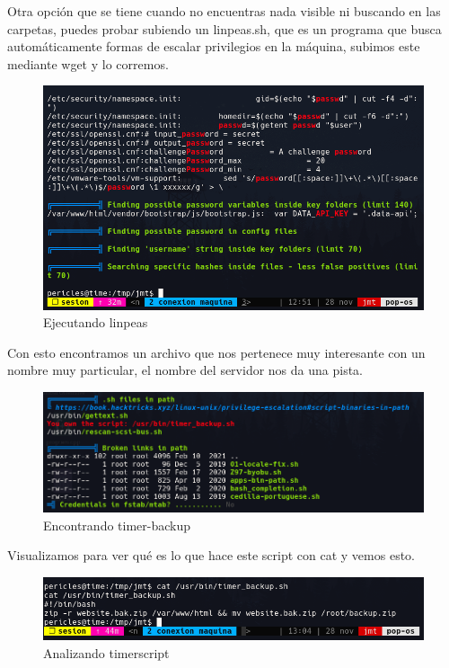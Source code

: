 \documentclass{article}
\begin{document}
Otra opción que se tiene cuando no encuentras nada visible ni buscando en las carpetas, puedes probar subiendo un linpeas.sh, que es un programa que busca automáticamente formas de escalar privilegios en la máquina, subimos este mediante wget y lo corremos.
\begin{figure}[H]
	\center
	\includegraphics[width=\textwidth]{images/time/linpeas.png}
	\caption{Ejecutando linpeas}
\end{figure}
Con esto encontramos un archivo que nos pertenece muy interesante con un nombre muy particular, el nombre del servidor nos da una pista.
\begin{figure}[H]
	\center
	\includegraphics[width=\textwidth]{images/time/time.png}
	\caption{Encontrando timer-backup}
\end{figure}
Visualizamos para ver qué es lo que hace este script con cat y vemos esto.
\begin{figure}[H]
	\center
	\includegraphics[width=\textwidth]{images/time/timerscript.png}
	\caption{Analizando timerscript}
\end{figure}
\end{document}
